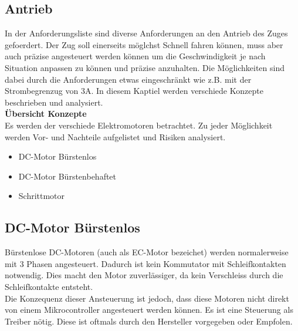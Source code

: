 \documentclass[../../main.tex]{subfiles}
\begin{document}
    \subsection{Antrieb}
    In der Anforderungsliste sind diverse Anforderungen an den Antrieb des Zuges gefoerdert.
    Der Zug soll einerseits möglchst Schnell fahren können, muss aber auch präzise angesteuert werden können um die Geschwindigkeit je nach Situation anpassen zu können und präzise anzuhalten.
    Die Möglichkeiten sind dabei durch die Anforderungen etwas eingeschränkt wie z.B. mit der Strombegrenzug von 3A.
    In diesem Kaptiel werden verschiede Konzepte beschrieben und analysiert.\\

    \textbf{Übersicht Konzepte}\\
    Es werden der verschiede Elektromotoren betrachtet. Zu jeder Möglichkeit werden Vor- und Nachteile aufgelistet und Risiken analysiert.

    \begin{itemize}
        \item DC-Motor Bürstenlos
        \item DC-Motor Bürstenbehaftet
        \item Schrittmotor
    \end{itemize}
    \subsection{DC-Motor Bürstenlos}

    Bürstenlose DC-Motoren (auch als EC-Motor bezeichet) werden normalerweise mit 3 Phasen angesteuert. Dadurch ist kein Kommutator mit Schleifkontakten notwendig. Dies macht den Motor zuverlässiger, da kein Verschleiss durch die Schleifkontakte entsteht.\\
    Die Konzequenz dieser Ansteuerung ist jedoch, dass diese Motoren nicht direkt von einem Mikrocontroller angesteuert werden können. Es ist eine Steuerung als Treiber nötig. Diese ist oftmals durch den Hersteller vorgegeben oder Empfolen.\\
\end{document}
